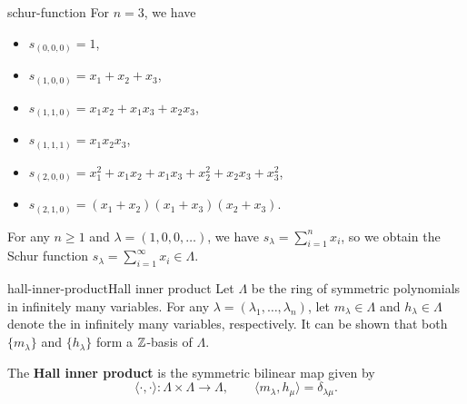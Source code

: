 \begin{example}{schur-function}
    For $n = 3$, we have
    \begin{itemize}
        \item $s_{(0, 0, 0)} = 1$,
        \item $s_{(1, 0, 0)} = x_1 + x_2 + x_3$,
        \item $s_{(1, 1, 0)} = x_1 x_2 + x_1 x_3 + x_2 x_3$,
        \item $s_{(1, 1, 1)} = x_1 x_2 x_3$,
        \item $s_{(2, 0, 0)} = x_1^2 + x_1 x_2 + x_1 x_3 + x_2^2 + x_2 x_3 + x_3^2$,
        \item $s_{(2, 1, 0)} = (x_1 + x_2) (x_1 + x_3) (x_2 + x_3)$.
    \end{itemize}
    For any $n \ge 1$ and $\lambda = (1, 0, 0, \ldots)$, we have $s_\lambda = \sum_{i = 1}^{n} x_i$, so we obtain the Schur function $s_\lambda = \sum_{i = 1}^{\infty} x_i \in \Lambda$.
\end{example}

    

\begin{topic}{hall-inner-product}{Hall inner product}
    Let $\Lambda$ be the ring of symmetric polynomials in infinitely many variables. For any  $\lambda = (\lambda_1, \ldots, \lambda_n)$, let $m_\lambda \in \Lambda$ and $h_\lambda \in \Lambda$ denote the  in infinitely many variables, respectively. It can be shown that both $\{ m_\lambda \}$ and $\{ h_\lambda \}$ form a $\mathbb{Z}$-basis of $\Lambda$.
    
    The \textbf{Hall inner product} is the symmetric bilinear map given by
    \[ \langle \cdot, \cdot \rangle \colon \Lambda \times \Lambda \to \Lambda, \qquad \langle m_\lambda, h_\mu \rangle = \delta_{\lambda \mu} . \]
\end{topic}


